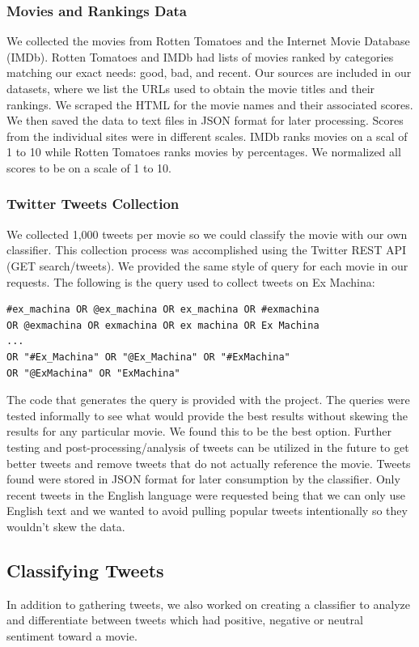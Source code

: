 \documentclass[12pt]{article}
\begin{document}
\subsubsection{Movies and Rankings Data}\label{S:4}
We collected the movies from Rotten Tomatoes and the Internet Movie Database (IMDb). Rotten Tomatoes and IMDb had lists of movies ranked by categories matching our exact needs: good, bad, and recent. Our sources are included in our datasets, where we list the URLs used to obtain the movie titles and their rankings.
We scraped the HTML for the movie names and their associated scores. We then saved the data to text files in JSON format for later processing. Scores from the individual sites were in different scales. IMDb ranks movies on a scal of 1 to 10 while Rotten Tomatoes ranks movies by percentages. We normalized all scores to be on a scale of 1 to 10.
\subsubsection{Twitter Tweets Collection}
We collected 1,000 tweets per movie so we could classify the movie with our own classifier. This collection process was accomplished using the Twitter REST API (GET search/tweets). We provided the same style of query for each movie in our requests. The following is the query used to collect tweets on Ex Machina:
\begin{verbatim}
#ex_machina OR @ex_machina OR ex_machina OR #exmachina 
OR @exmachina OR exmachina OR ex machina OR Ex Machina 
...
OR "#Ex_Machina" OR "@Ex_Machina" OR "#ExMachina" 
OR "@ExMachina" OR "ExMachina"
\end{verbatim}
The code that generates the query is provided with the project. The queries were tested informally to see what would provide the best results without skewing the results for any particular movie. We found this to be the best option. Further testing and post-processing/analysis of tweets can be utilized in the future to get better tweets and remove tweets that do not actually reference the movie.
Tweets found were stored in JSON format for later consumption by the classifier.
Only recent tweets in the English language were requested being that we can only use English text and we wanted to avoid pulling popular tweets intentionally so they wouldn't skew the data.
\subsection{Classifying Tweets}\label{S:3}
In addition to gathering tweets, we also worked on creating a classifier to analyze and differentiate between tweets which had positive, negative or neutral sentiment toward a movie. 
\end{document}
